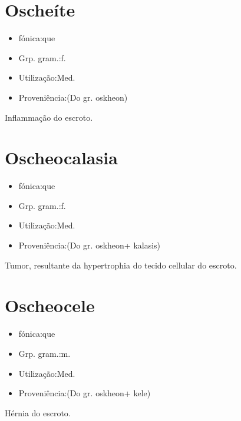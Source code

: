 \section{Oscheíte}
\begin{itemize}
\item {fónica:que}
\end{itemize}
\begin{itemize}
\item {Grp. gram.:f.}
\end{itemize}
\begin{itemize}
\item {Utilização:Med.}
\end{itemize}
\begin{itemize}
\item {Proveniência:(Do gr. \textunderscore oskheon\textunderscore )}
\end{itemize}
Inflammação do escroto.
\section{Oscheocalasia}
\begin{itemize}
\item {fónica:que}
\end{itemize}
\begin{itemize}
\item {Grp. gram.:f.}
\end{itemize}
\begin{itemize}
\item {Utilização:Med.}
\end{itemize}
\begin{itemize}
\item {Proveniência:(Do gr. \textunderscore oskheon\textunderscore  + \textunderscore kalasis\textunderscore )}
\end{itemize}
Tumor, resultante da hypertrophia do tecido cellular do escroto.
\section{Oscheocele}
\begin{itemize}
\item {fónica:que}
\end{itemize}
\begin{itemize}
\item {Grp. gram.:m.}
\end{itemize}
\begin{itemize}
\item {Utilização:Med.}
\end{itemize}
\begin{itemize}
\item {Proveniência:(Do gr. \textunderscore oskheon\textunderscore  + \textunderscore kele\textunderscore )}
\end{itemize}
Hérnia do escroto.
